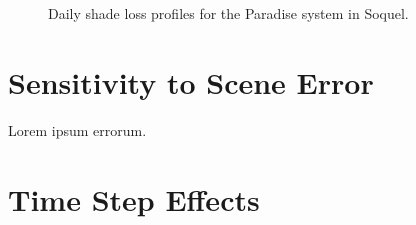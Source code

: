 \documentclass[twocolumn,10pt]{asme2ej}
\begin{document}
\begin{figure}[h!]
\begin{center}
\end{center}
\caption{Daily shade loss profiles for the Paradise system in Soquel.}
\label{fig:ivanhoe_denver_profiles}
\end{figure}




\section{Sensitivity to Scene Error}

Lorem ipsum errorum.

\section{Time Step Effects}
\end{document}
